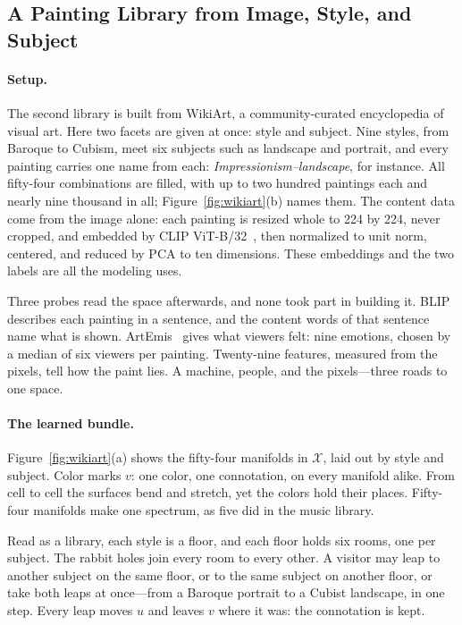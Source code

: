 \subsection{A Painting Library from Image, Style, and Subject}

\paragraph{Setup.}
The second library is built from WikiArt, a community-curated encyclopedia of
visual art. Here two facets are given at once: style and subject. Nine styles,
from Baroque to Cubism, meet six subjects such as landscape and portrait, and
every painting carries one name from each: \textit{Impressionism--landscape},
for instance. All fifty-four combinations are filled, with up to two hundred
paintings each and nearly nine thousand in all; Figure~\ref{fig:wikiart}(b)
names them. The content data come from the image alone: each painting is resized
whole to 224 by 224, never cropped, and embedded by CLIP
ViT-B/32~\citep{Radford20218748,Cherti20232818},
then normalized to unit norm, centered, and reduced by PCA to ten dimensions.
These embeddings and the two labels are all the modeling uses.

Three probes read the space afterwards, and none took part in building
it. BLIP~\citep{Li202212888} describes each painting in a sentence, and the
content words of that sentence name what is shown.
ArtEmis~\citep{Achlioptas202111564} gives what viewers felt: nine emotions,
chosen by a median of six viewers per painting. Twenty-nine features,
measured from the pixels, tell how the paint lies. A machine, people,
and the pixels---three roads to one space.

\paragraph{The learned bundle.}
Figure~\ref{fig:wikiart}(a) shows the fifty-four manifolds in
$\mathcal{X}$, laid out by style and subject. Color marks $v$: one
color, one connotation, on every manifold alike. From cell to cell
the surfaces bend and stretch, yet the colors hold their places.
Fifty-four manifolds make one spectrum, as five did in the music library.

Read as a library, each style is a floor, and each floor holds six
rooms, one per subject. The rabbit holes join every room to every
other. A visitor may leap to another subject on the same floor, or to
the same subject on another floor, or take both leaps at once---from a
Baroque portrait to a Cubist landscape, in one step. Every leap moves
$u$ and leaves $v$ where it was: the connotation is kept.


